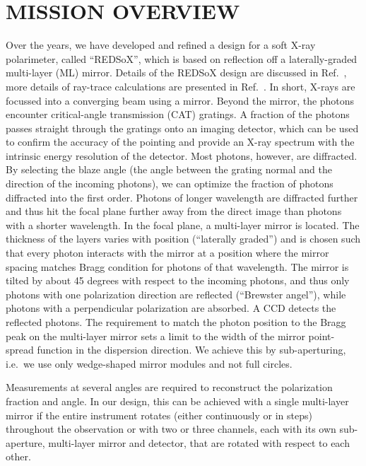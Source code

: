 \documentclass[]{spie}  %
\begin{document}
\section{MISSION OVERVIEW}
Over the years, we have developed and refined a design for a soft
X-ray polarimeter, called ``REDSoX'', which is based on reflection off
a laterally-graded multi-layer (ML) mirror.  Details of the REDSoX
design are discussed in Ref.~, more details of
ray-trace calculations are presented in Ref.~.
In short, X-rays are focussed into a converging beam using a
mirror. Beyond the mirror, the photons encounter critical-angle
transmission (CAT)
gratings\cite{Heilmann:11,doi:10.1117/12.2188525,10.1117/12.2314180,10.1117/12.2529354}. A
fraction of the photons passes straight through the gratings onto an
imaging detector, which can be used to confirm the accuracy of the
pointing and provide an X-ray spectrum with the intrinsic energy
resolution of the detector. Most photons, however, are diffracted. By
selecting the blaze angle (the angle between the grating normal and
the direction of the incoming photons), we can optimize the fraction
of photons diffracted into the first order. Photons of longer
wavelength are diffracted further and thus hit the focal plane further
away from the direct image than photons with a shorter wavelength. In
the focal plane, a multi-layer mirror is located. The thickness of the
layers varies with position (``laterally graded'') and is chosen such
that every photon interacts with the mirror at a position where the
mirror spacing matches Bragg condition for photons of that
wavelength\cite{redsox,redsoxtrace}. The mirror is tilted by about 45
degrees with respect to the incoming photons, and thus only photons
with one polarization direction are reflected (``Brewster angel''),
while photons with a perpendicular polarization are absorbed. A CCD
detects the reflected photons. The requirement to match the photon
position to the Bragg peak on the multi-layer mirror sets a limit to
the width of the mirror point-spread function in the dispersion
direction. We achieve this by sub-aperturing, i.e.\ we use only
wedge-shaped mirror modules and not full circles.

Measurements at several angles are required to reconstruct the
polarization fraction and angle. In our design, this can be achieved
with a single multi-layer mirror if the entire instrument rotates
(either continuously or in steps) throughout the observation or with
two or three channels, each with its own sub-aperture, multi-layer
mirror and detector, that are rotated with respect to each other.
\end{document}
